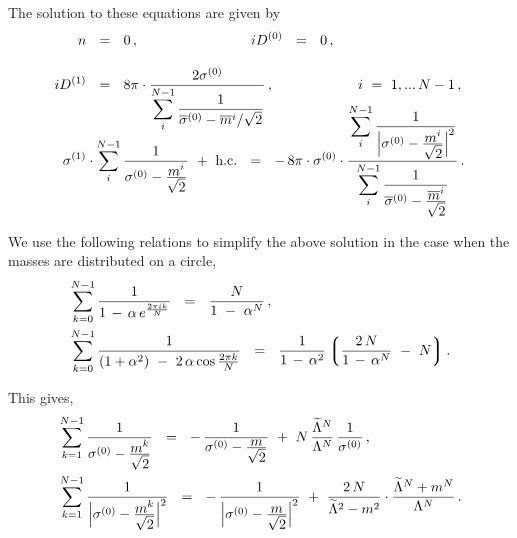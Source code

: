 \documentclass[12pt]{article}
\newcommand{\wt}{\widetilde}
\newcommand{\ov}{\overline}
\newcommand{\lgr}{\left\lgroup}
\newcommand{\rgr}{\right\rgroup}
\newcommand{\Dz}{{D^{(0)}}}
\newcommand{\Do}{{D^{(1)}}}
\newcommand{\sigz}{{\sigma^{(0)}}}
\newcommand{\sigo}{{\sigma^{(1)}}}
\newcommand{\bsigz}{{\ov{\sigma}{}^{(0)}}}
\begin{document}
	The solution to these equations are given by
\begin{align}
%
\notag
	n & ~~=~~ 0 \,,  \qquad\qquad\qquad\qquad i \Dz ~~=~~ 0\,,
	\\[3mm]
%
\label{strongeq}
	i \Do & ~~=~~ 8\pi \cdot \frac{ 2\sigz } 
			{\displaystyle \sum_{i}^{N-1} 
				\frac{1}{ \bsigz - \ov{m}{}^i/\sqrt{2}} } \,,
	\qquad\qquad\qquad i ~=~ 1,...\, N-1\,,
	\\[-8mm]
%
\notag
	\sigo & \cdot \sum_{i}^{N-1} \frac{1}
			{ \sigz - \frac{\displaystyle m^i}{\displaystyle\sqrt{2}} }
		~+~ \text{h.c.} ~~=~~
	-\, 8\pi \cdot \sigz \cdot 
	\frac{ \displaystyle \sum_{i}^{N-1} 
			\frac{1}{ \Bigl| \sigz - \frac{\displaystyle m^i}{\displaystyle\sqrt{2}} \Bigr|^2 } }
	  { \displaystyle \sum_{i}^{N-1} 
				\frac{1}{ \bsigz - \frac{\displaystyle \ov{m}{}^i}
							{\displaystyle \sqrt{2}} } }\,.
\end{align}

	We use the following relations to simplify the above solution in the case when the masses 
	are distributed on a circle,
\begin{align*}
%
	&
	\sum_{k=0}^{N-1} \frac{1} { 1 \,-\, \alpha\,e^{\frac{2\pi i k}{N}} } ~~=~~
		\frac{N}{1 ~-~ \alpha^N}\,,
	\\
%
	&
	\sum_{k=0}^{N-1} \frac{1} { (1 + \alpha^2) ~-~ 2\,\alpha \cos \frac{2 \pi k}{N} }
		~~=~~
	\frac{1} {1 \,-\, \alpha^2} 
	\lgr \frac{2\,N}{ 1 \,-\, \alpha^N } ~-~ N \rgr .
\end{align*}

	This gives,
\begin{align*}
%
	& 
	\sum_{k=1}^{N-1} \frac{ 1 }
		{ \sigz - \frac{\displaystyle m^k}{\displaystyle \sqrt{2}} } ~~=~~ 
		 - \, \frac{ 1 }
		{ \sigz - \frac{\displaystyle m}{\displaystyle \sqrt{2}} } ~+~
		N\, \frac{\wt{\Lambda}{}^N}{\Lambda^N}\, \frac{1}{\sigz} \,,
	\\
%
	&
	\sum_{k=1}^{N-1} \frac{ 1 }
                { \Bigl| \sigz - \frac{\displaystyle m^k}{\displaystyle \sqrt{2}} \Bigr|^2 } ~~=~~
	-\, \frac{1}
	{ \Bigl| \sigz - \frac{\displaystyle m}{\displaystyle \sqrt{2}} \Bigr|^2 } 
	~+~
	\frac{2\,N}{ \wt{\Lambda}{}^2 - m^2 } \cdot
	\frac{ \wt{\Lambda}{}^N + m^N } { \Lambda^N }\,.
\end{align*}
\end{document}
